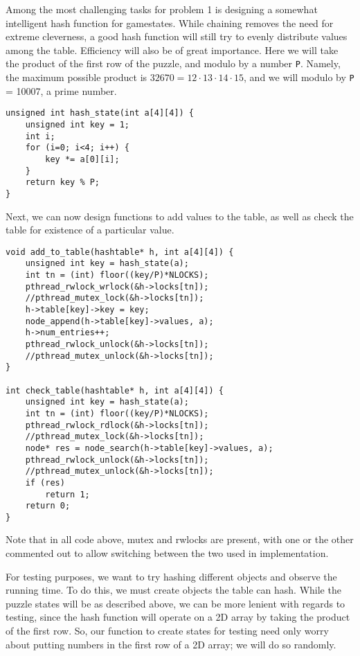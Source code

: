 \documentclass[11pt]{article}
\begin{document}
Among the most challenging tasks for problem 1 is designing a somewhat
intelligent hash function for gamestates. While chaining removes the
need for extreme cleverness, a good hash function will still try to
evenly distribute values among the table. Efficiency will also be of
great importance. Here we will take the product of the first row of
the puzzle, and modulo by a number \verb~P~. Namely, the maximum possible
product is $32670 = 12\cdot 13 \cdot 14\cdot 15$, and we will modulo
by \verb~P~ = 10007, a prime number.

\begin{verbatim}
unsigned int hash_state(int a[4][4]) {
    unsigned int key = 1;
    int i;
    for (i=0; i<4; i++) {
        key *= a[0][i];
    }
    return key % P;
}
\end{verbatim}

Next, we can now design functions to add values to the table, as well
as check the table for existence of a particular value.

\begin{verbatim}
void add_to_table(hashtable* h, int a[4][4]) {
    unsigned int key = hash_state(a);
    int tn = (int) floor((key/P)*NLOCKS);
    pthread_rwlock_wrlock(&h->locks[tn]);
    //pthread_mutex_lock(&h->locks[tn]);
    h->table[key]->key = key;
    node_append(h->table[key]->values, a);
    h->num_entries++;
    pthread_rwlock_unlock(&h->locks[tn]);
    //pthread_mutex_unlock(&h->locks[tn]);
}

int check_table(hashtable* h, int a[4][4]) {
    unsigned int key = hash_state(a);
    int tn = (int) floor((key/P)*NLOCKS);
    pthread_rwlock_rdlock(&h->locks[tn]);
    //pthread_mutex_lock(&h->locks[tn]);
    node* res = node_search(h->table[key]->values, a);
    pthread_rwlock_unlock(&h->locks[tn]);
    //pthread_mutex_unlock(&h->locks[tn]);
    if (res)
        return 1;
    return 0;
}
\end{verbatim}

Note that in all code above, mutex and rwlocks are present, with one
or the other commented out to allow switching between the two used in
implementation.

For testing purposes, we want to try hashing different objects and
observe the running time. To do this, we must create objects the table
can hash. While the puzzle states will be as described above, we can
be more lenient with regards to testing, since the hash function will
operate on a 2D array by taking the product of the first row. So, our
function to create states for testing need only worry about putting
numbers in the first row of a 2D array; we will do so randomly.
\end{document}
